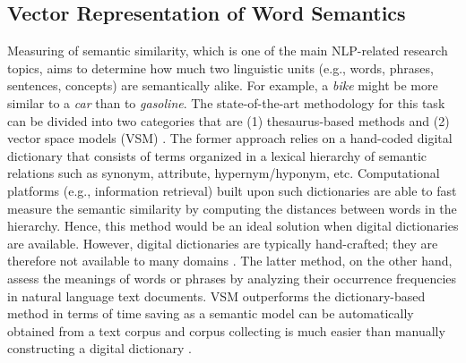 \documentclass[Journal, BackFigs, DoubleSpace]{ascelike}%
\begin{document}
\subsection{Vector Representation of Word Semantics}
Measuring of semantic similarity, which is one of the main NLP-related research topics, aims to determine how much two linguistic units (e.g., words, phrases, sentences, concepts) are semantically alike. For example, a \textit{bike} might be more similar to a \textit{car} than to \textit{gasoline}. The state-of-the-art methodology for this task can be divided into two categories that are (1) thesaurus-based methods and (2) vector space models (VSM) \cite{harispe13}. The former approach relies on a hand-coded digital dictionary that consists of terms organized in a lexical hierarchy of semantic relations such as synonym, attribute, hypernym/hyponym, etc. Computational platforms (e.g., information retrieval) built upon such dictionaries are able to fast measure the semantic similarity by computing the distances between words in the hierarchy. Hence, this method would be an ideal solution when digital dictionaries are available. However, digital dictionaries are typically hand-crafted; they are therefore not available to many domains \cite{kolb08}. The latter method, on the other hand, assess the meanings of words or phrases by analyzing their occurrence frequencies in natural language text documents. VSM outperforms the dictionary-based method in terms of time saving as a semantic model can be automatically obtained from a text corpus and corpus collecting is much easier than manually constructing a digital dictionary \cite{turney10}.
\par
\end{document}
